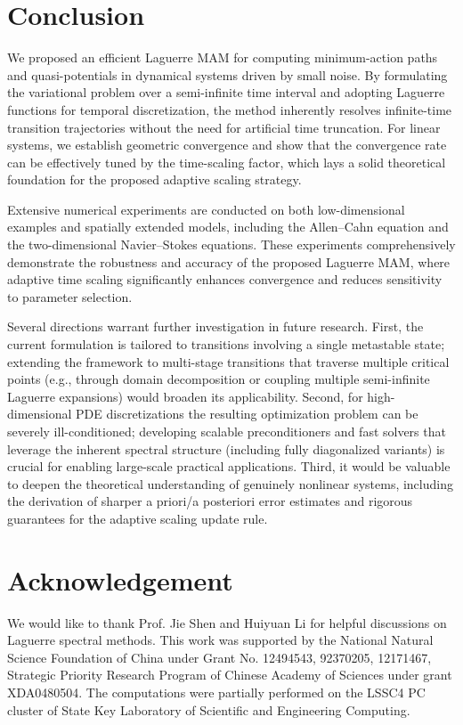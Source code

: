 \documentclass[a4paper,fleqn, 12pt]{cas-sc}
\numberwithin{table}{section}
\begin{document}
\section{Conclusion}
\label{conclusion}
We proposed an efficient Laguerre MAM for computing minimum-action paths and quasi-potentials in dynamical systems driven by small noise. By formulating the variational problem over a semi-infinite time interval and adopting Laguerre functions for temporal discretization, the method inherently resolves infinite-time transition trajectories without the need for artificial time truncation. For linear systems, we establish geometric convergence and show that the convergence rate can be effectively tuned by the time-scaling factor, which lays a solid theoretical foundation for the proposed adaptive scaling strategy. 

Extensive numerical experiments are conducted on both low-dimensional examples and spatially extended models, including the Allen--Cahn equation and the two-dimensional Navier--Stokes equations. These experiments comprehensively demonstrate the robustness and accuracy of the proposed Laguerre MAM, where adaptive time scaling significantly enhances convergence and reduces sensitivity to parameter selection.

Several directions warrant further investigation in future research. First, the current formulation is tailored to transitions involving a single metastable state; extending the framework to multi-stage transitions that traverse multiple critical points (e.g., through domain decomposition or  coupling multiple semi-infinite Laguerre expansions) would broaden its applicability. Second, for high-dimensional PDE discretizations the resulting optimization problem can be severely ill-conditioned; developing scalable preconditioners and fast solvers that leverage the inherent spectral structure (including fully diagonalized variants) is crucial for enabling large-scale practical applications. Third, it would be valuable to deepen the theoretical understanding of genuinely nonlinear systems, including the derivation of sharper a priori/a posteriori error estimates and rigorous guarantees for the adaptive scaling update rule. 


\section*{Acknowledgement}
We would like to thank Prof. Jie Shen and Huiyuan Li for helpful discussions on
Laguerre spectral methods. This work was supported by the National Natural Science Foundation of China under Grant No. 12494543, 92370205, 12171467,
Strategic Priority Research Program of Chinese Academy of Sciences under grant XDA0480504. 
The computations were partially performed on the LSSC4 PC cluster of State Key Laboratory of Scientific and Engineering Computing.


%


\appendix
\end{document}
